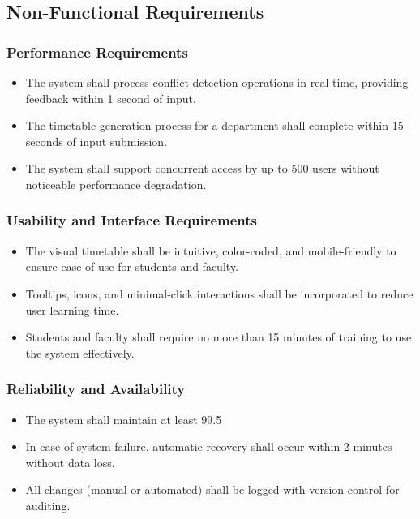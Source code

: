 \documentclass[a4paper,12pt]{article}
\begin{document}
\subsection{Non-Functional Requirements}
\subsubsection{Performance Requirements}
\begin{itemize}
\item The system shall process conflict detection operations in real time, providing feedback within 1 second of input.

\item The timetable generation process for a department shall complete within 15 seconds of input submission.

\item The system shall support concurrent access by up to 500 users without noticeable performance degradation.
\end{itemize}

\subsubsection{Usability and Interface Requirements}
\begin{itemize}
\item The visual timetable shall be intuitive, color-coded, and mobile-friendly to ensure ease of use for students and faculty.

\item Tooltips, icons, and minimal-click interactions shall be incorporated to reduce user learning time.

\item Students and faculty shall require no more than 15 minutes of training to use the system effectively.
\end{itemize}

\subsubsection{Reliability and Availability}
\begin{itemize}
\item The system shall maintain at least 99.5%

\item In case of system failure, automatic recovery shall occur within 2 minutes without data loss.

\item All changes (manual or automated) shall be logged with version control for auditing.
\end{itemize}
\end{document}
